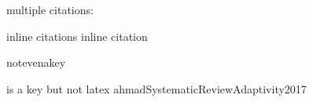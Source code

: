 multiple citations:

\cite{abdaiMethodologicalChallengesUse2018, abecasisHIV1SubtypeDistribution2013}


\cite{ahmadSystematicReviewAdaptivity2017}

inline citations \cite{ahmadSystematicReviewAdaptivity2017} inline citation

\cite{missingkey}

notevenakey

is a key but not latex ahmadSystematicReviewAdaptivity2017
